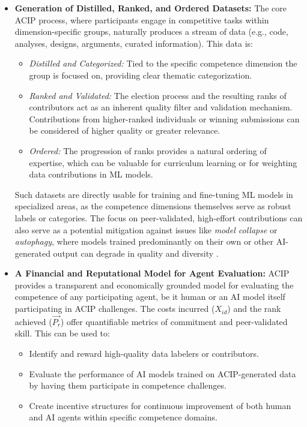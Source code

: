 \documentclass{article}
\begin{document}
\begin{CJK}{UTF8}{gbsn}
    \begin{itemize}
        \item \textbf{Generation of Distilled, Ranked, and Ordered Datasets:} The core ACIP process, where participants engage in competitive tasks within dimension-specific groups, naturally produces a stream of data (e.g., code, analyses, designs, arguments, curated information). This data is:
              \begin{itemize}[label=\textbullet, leftmargin=*]
                  \item \textit{Distilled and Categorized:} Tied to the specific competence dimension the group is focused on, providing clear thematic categorization.
                  \item \textit{Ranked and Validated:} The election process and the resulting ranks of contributors act as an inherent quality filter and validation mechanism. Contributions from higher-ranked individuals or winning submissions can be considered of higher quality or greater relevance.
                  \item \textit{Ordered:} The progression of ranks provides a natural ordering of expertise, which can be valuable for curriculum learning or for weighting data contributions in ML models.
              \end{itemize}
              Such datasets are directly usable for training and fine-tuning ML models in specialized areas, as the competence dimensions themselves serve as robust labels or categories. {{The focus on peer-validated, high-effort contributions can also serve as a potential mitigation against issues like \textit{model collapse} or \textit{autophagy}, where models trained predominantly on their own or other AI-generated output can degrade in quality and diversity \cite{dohmatob2024strongmodelcollapse}.}}

        \item \textbf{A Financial and Reputational Model for Agent Evaluation:} ACIP provides a transparent and economically grounded model for evaluating the competence of any participating agent, be it human or an AI model itself participating in ACIP challenges. The costs incurred ($X_{id}$) and the rank achieved ($\vec{P_r}$) offer quantifiable metrics of commitment and peer-validated skill. This can be used to:
              \begin{itemize}[label=\textbullet, leftmargin=*]
                  \item Identify and reward high-quality data labelers or contributors.
                  \item Evaluate the performance of AI models trained on ACIP-generated data by having them participate in competence challenges.
                  \item Create incentive structures for continuous improvement of both human and AI agents within specific competence domains.
              \end{itemize}


\end{itemize}
\end{CJK}
\end{document}
